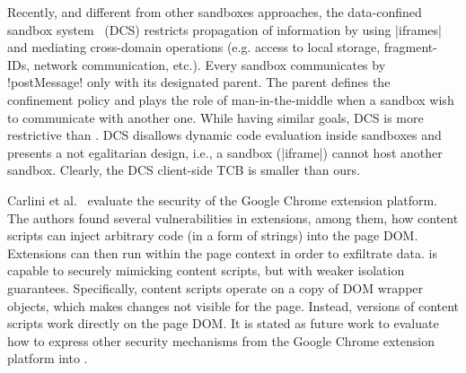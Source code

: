 Recently, and different from other sandboxes approaches, the data-confined
sandbox system~\cite{Akhawe2013} (DCS) restricts propagation of information by using
\js|iframes| and mediating cross-domain operations (e.g. access to local
storage, fragment-IDs, network communication, etc.).  Every sandbox communicates
by \js!postMessage! only with its designated parent. The parent defines the
confinement policy and plays the role of man-in-the-middle when a sandbox wish
to communicate with another one. While having similar goals, DCS is more
restrictive than \sys. DCS disallows dynamic code evaluation inside sandboxes
and presents a not egalitarian design, i.e., a sandbox (\js|iframe|) cannot host
another sandbox. Clearly, the DCS client-side TCB is smaller than ours.


Carlini et al.~\cite{Carlini:2012} evaluate the security of the Google Chrome
extension platform. The authors found several vulnerabilities in extensions, among them,
how content scripts can inject arbitrary code (in a form of strings) into the
page DOM. Extensions can then run within the page context in order
to exfiltrate data. \sys{} is capable to securely mimicking content scripts, but
with  weaker isolation guarantees.  Specifically, content scripts operate on a
copy of DOM wrapper objects, which makes changes not visible for the
page. Instead, \sys{} versions of content scripts work directly on the page DOM.
It is stated as future work to evaluate how to express other 
security mechanisms from the Google Chrome extension platform into \sys{}. 


 
 


